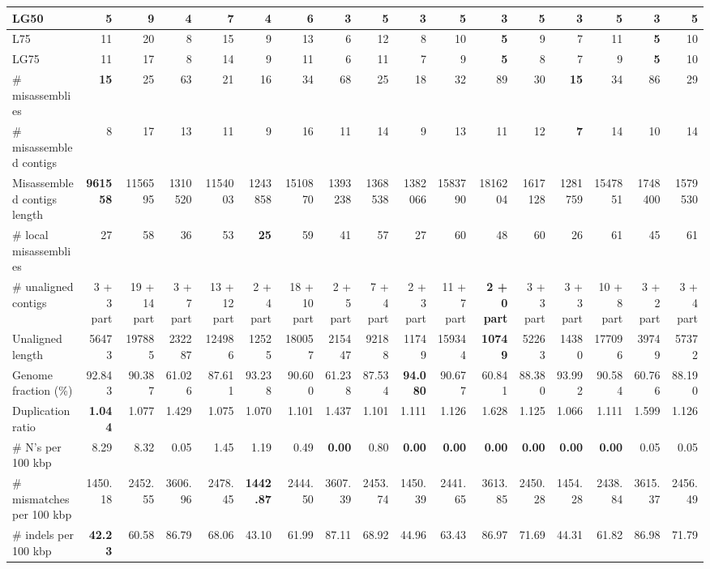 \documentclass[12pt,a4paper]{article}
\begin{document}
\begin{table}[ht]
\begin{center}
\begin{tabular}{|l*{16}{|r}|}
LG50 & 5 & 9 & 4 & 7 & 4 & 6 & {\bf 3} & 5 & {\bf 3} & 5 & {\bf 3} & 5 & {\bf 3} & 5 & {\bf 3} & 5 \\ \hline
L75 & 11 & 20 & 8 & 15 & 9 & 13 & 6 & 12 & 8 & 10 & {\bf 5} & 9 & 7 & 11 & {\bf 5} & 10 \\ \hline
LG75 & 11 & 17 & 8 & 14 & 9 & 11 & 6 & 11 & 7 & 9 & {\bf 5} & 8 & 7 & 9 & {\bf 5} & 10 \\ \hline
\# misassemblies & {\bf 15} & 25 & 63 & 21 & 16 & 34 & 68 & 25 & 18 & 32 & 89 & 30 & {\bf 15} & 34 & 86 & 29 \\ \hline
\# misassembled contigs & 8 & 17 & 13 & 11 & 9 & 16 & 11 & 14 & 9 & 13 & 11 & 12 & {\bf 7} & 14 & 10 & 14 \\ \hline
Misassembled contigs length & {\bf 961558} & 1156595 & 1310520 & 1154003 & 1243858 & 1510870 & 1393238 & 1368538 & 1382066 & 1583790 & 1816204 & 1617128 & 1281759 & 1547851 & 1748400 & 1579530 \\ \hline
\# local misassemblies & 27 & 58 & 36 & 53 & {\bf 25} & 59 & 41 & 57 & 27 & 60 & 48 & 60 & 26 & 61 & 45 & 61 \\ \hline
\# unaligned contigs & 3 + 3 part & 19 + 14 part & 3 + 7 part & 13 + 12 part & 2 + 4 part & 18 + 10 part & 2 + 5 part & 7 + 4 part & 2 + 3 part & 11 + 7 part & {\bf 2 + 0 part} & 3 + 3 part & 3 + 3 part & 10 + 8 part & 3 + 2 part & 3 + 4 part \\ \hline
Unaligned length & 56473 & 197885 & 232287 & 124986 & 12525 & 180057 & 215447 & 92188 & 11749 & 159344 & {\bf 10749} & 52263 & 14380 & 177096 & 39749 & 57372 \\ \hline
Genome fraction (\%) & 92.843 & 90.387 & 61.026 & 87.611 & 93.238 & 90.600 & 61.238 & 87.534 & {\bf 94.080} & 90.677 & 60.841 & 88.380 & 93.992 & 90.584 & 60.766 & 88.190 \\ \hline
Duplication ratio & {\bf 1.044} & 1.077 & 1.429 & 1.075 & 1.070 & 1.101 & 1.437 & 1.101 & 1.111 & 1.126 & 1.628 & 1.125 & 1.066 & 1.111 & 1.599 & 1.126 \\ \hline
\# N's per 100 kbp & 8.29 & 8.32 & 0.05 & 1.45 & 1.19 & 0.49 & {\bf 0.00} & 0.80 & {\bf 0.00} & {\bf 0.00} & {\bf 0.00} & {\bf 0.00} & {\bf 0.00} & {\bf 0.00} & 0.05 & 0.05 \\ \hline
\# mismatches per 100 kbp & 1450.18 & 2452.55 & 3606.96 & 2478.45 & {\bf 1442.87} & 2444.50 & 3607.39 & 2453.74 & 1450.39 & 2441.65 & 3613.85 & 2450.28 & 1454.28 & 2438.84 & 3615.37 & 2456.49 \\ \hline
\# indels per 100 kbp & {\bf 42.23} & 60.58 & 86.79 & 68.06 & 43.10 & 61.99 & 87.11 & 68.92 & 44.96 & 63.43 & 86.97 & 71.69 & 44.31 & 61.82 & 86.98 & 71.79 \\ \hline

\end{tabular}
\end{center}
\end{table}
\end{document}
